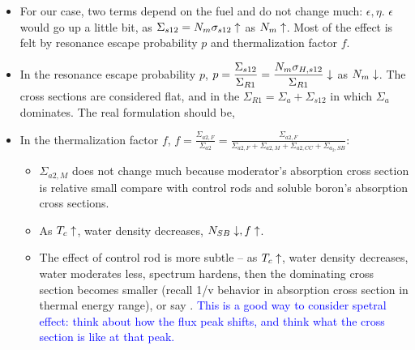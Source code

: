 \documentclass{school-22.211-notes}
\begin{document}
\begin{enumerate}
\begin{itemize}
      \item For our case, two terms depend on the fuel and do not change much: $\epsilon, \eta$. $\epsilon$ would go up a little bit, as $\Sigma_{s12} = N_m \sigma_{s12} \uparrow$ as $N_m \uparrow$. Most of the effect is felt by resonance escape probability $p$ and thermalization factor $f$. 

      \item In the resonance escape probability $p$, $\displaystyle p = \frac{\Sigma_{s12}}{\Sigma_{R1}} = \frac{N_m \sigma_{H, s12}}{\Sigma_{R1}} \downarrow$ as $N_m \downarrow$. The cross sections are considered flat, and in the $\Sigma_{R1} = \Sigma_a + \Sigma_{s12}$ in which $\Sigma_a$ dominates. The real formulation should be,

      \item In the thermalization factor $f$, $\displaystyle f = \frac{\Sigma_{a2,F}}{\Sigma_{a2}} = \frac{\Sigma_{a2, F}}{\Sigma_{a2,F} + \Sigma_{a2, M} + \Sigma_{a2, CC} + \Sigma_{a_2, SB}} $: 
        \begin{itemize}
        \item $\Sigma_{a2,M}$ does not change much because moderator's absorption cross section is relative small compare with control rods and soluble boron's absorption cross sections. 
        \item As $T_c \uparrow$, water density decreases, $N_{SB} \downarrow, f \uparrow$. 
        \item The effect of control rod is more subtle -- as $T_c \uparrow$, water density decreases, water moderates less, spectrum hardens, then the dominating cross section becomes smaller (recall 1/v behavior in absorption cross section in thermal energy range), or say . \textcolor{blue}{This is a good way to consider spetral effect: think about how the flux peak shifts, and think what the cross section is like at that peak.}
        \end{itemize}
        

\end{itemize}
\end{enumerate}
\end{document}
